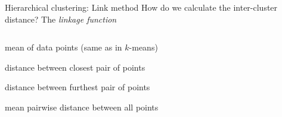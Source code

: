 \documentclass[pdf]{beamer}
\begin{document}
\begin{frame}{Hierarchical clustering: Link method}
How do we calculate the inter-cluster distance? The \textit{linkage function}
\begin{columns}
\begin{description}[Complete:]\addtolength{\itemsep}{0.8\baselineskip}
	\item<2-> [Centroid:] mean of data points (same as in $k$-means)
	\item<3-> [Single:] distance between closest pair of points
	\item<4-> [Complete:] distance between furthest pair of points
	\item<5-> [Average:] mean pairwise distance between all points
\end{description}
\begin{center}
	\vfill
	\vfill
	\vfill
\end{center}
\end{columns}
\end{frame}
\end{document}
